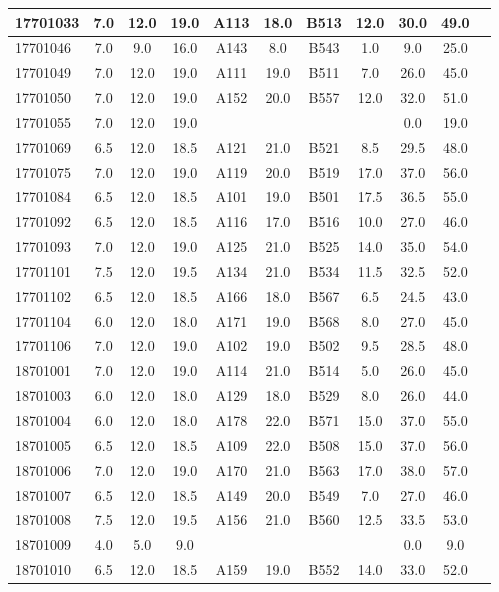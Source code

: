 \documentclass[12pt]{article}
\begin{document}
\begin{center}
\begin{small}
\begin{tabular}{|l|c|c|c|c|c|c|c|c|c|c|}
17701033 & 7.0 & 12.0 & 19.0 & A113 & 18.0 & B513 & 12.0 & 30.0 & 49.0\\ \hline 
17701046 & 7.0 & 9.0 & 16.0 & A143 & 8.0 & B543 & 1.0 & 9.0 & 25.0\\ \hline 
17701049 & 7.0 & 12.0 & 19.0 & A111 & 19.0 & B511 & 7.0 & 26.0 & 45.0\\ \hline 
17701050 & 7.0 & 12.0 & 19.0 & A152 & 20.0 & B557 & 12.0 & 32.0 & 51.0\\ \hline 
17701055 & 7.0 & 12.0 & 19.0 &  &  &  &  & 0.0 & 19.0\\ \hline 
17701069 & 6.5 & 12.0 & 18.5 & A121 & 21.0 & B521 & 8.5 & 29.5 & 48.0\\ \hline 
17701075 & 7.0 & 12.0 & 19.0 & A119 & 20.0 & B519 & 17.0 & 37.0 & 56.0\\ \hline 
17701084 & 6.5 & 12.0 & 18.5 & A101 & 19.0 & B501 & 17.5 & 36.5 & 55.0\\ \hline 
17701092 & 6.5 & 12.0 & 18.5 & A116 & 17.0 & B516 & 10.0 & 27.0 & 46.0\\ \hline 
17701093 & 7.0 & 12.0 & 19.0 & A125 & 21.0 & B525 & 14.0 & 35.0 & 54.0\\ \hline 
17701101 & 7.5 & 12.0 & 19.5 & A134 & 21.0 & B534 & 11.5 & 32.5 & 52.0\\ \hline 
17701102 & 6.5 & 12.0 & 18.5 & A166 & 18.0 & B567 & 6.5 & 24.5 & 43.0\\ \hline 
17701104 & 6.0 & 12.0 & 18.0 & A171 & 19.0 & B568 & 8.0 & 27.0 & 45.0\\ \hline 
17701106 & 7.0 & 12.0 & 19.0 & A102 & 19.0 & B502 & 9.5 & 28.5 & 48.0\\ \hline 
18701001 & 7.0 & 12.0 & 19.0 & A114 & 21.0 & B514 & 5.0 & 26.0 & 45.0\\ \hline 
18701003 & 6.0 & 12.0 & 18.0 & A129 & 18.0 & B529 & 8.0 & 26.0 & 44.0\\ \hline 
18701004 & 6.0 & 12.0 & 18.0 & A178 & 22.0 & B571 & 15.0 & 37.0 & 55.0\\ \hline 
18701005 & 6.5 & 12.0 & 18.5 & A109 & 22.0 & B508 & 15.0 & 37.0 & 56.0\\ \hline 
18701006 & 7.0 & 12.0 & 19.0 & A170 & 21.0 & B563 & 17.0 & 38.0 & 57.0\\ \hline 
18701007 & 6.5 & 12.0 & 18.5 & A149 & 20.0 & B549 & 7.0 & 27.0 & 46.0\\ \hline 
18701008 & 7.5 & 12.0 & 19.5 & A156 & 21.0 & B560 & 12.5 & 33.5 & 53.0\\ \hline 
18701009 & 4.0 & 5.0 & 9.0 &  &  &  &  & 0.0 & 9.0\\ \hline 
18701010 & 6.5 & 12.0 & 18.5 & A159 & 19.0 & B552 & 14.0 & 33.0 & 52.0\\ \hline 
        \end{tabular}
            \end{small}
            \end{center}
  \centering
            
\end{document}
